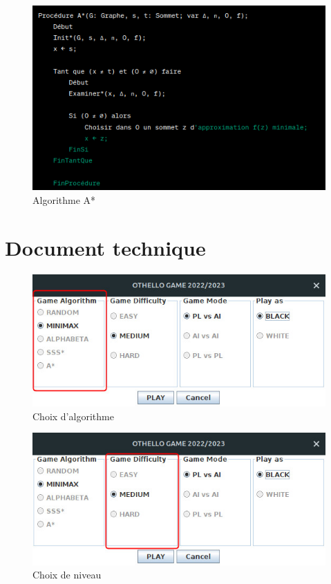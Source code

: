 \documentclass[12pt]{article}
\begin{document}
	\begin{figure}[H]
	\centering
	\includegraphics[scale=0.7]{img/A}
	\caption{Algorithme A* }
	\label{Algorithme A*}
\end{figure}



	


\section{Document technique}
	
		\begin{figure}[H]
		\centering
		\includegraphics[scale=0.7]{img/othello_startAlgo.jpg}
		\caption{Choix d'algorithme }
		\label{Algo}
	\end{figure}

	\begin{figure}[H]
	\centering
	\includegraphics[scale=0.7]{img/othello_startNiveau.jpg}
	\caption{Choix de niveau }
	\label{niveau}
\end{figure}
\end{document}
